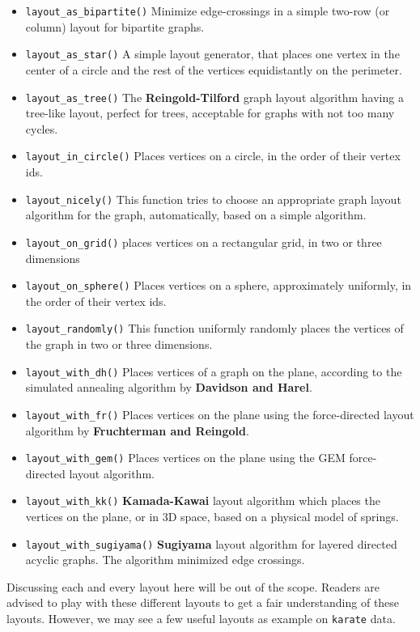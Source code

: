 \documentclass[
]{book}
\providecommand{\tightlist}{%
  \setlength{\itemsep}{0pt}\setlength{\parskip}{0pt}}
\begin{document}
\begin{itemize}
\tightlist
\item
  \texttt{layout\_as\_bipartite()} Minimize edge-crossings in a simple two-row (or column) layout for bipartite graphs.
\item
  \texttt{layout\_as\_star()} A simple layout generator, that places one vertex in the center of a circle and the rest of the vertices equidistantly on the perimeter.
\item
  \texttt{layout\_as\_tree()} The \textbf{Reingold-Tilford} graph layout algorithm having a tree-like layout, perfect for trees, acceptable for graphs with not too many cycles.
\item
  \texttt{layout\_in\_circle()} Places vertices on a circle, in the order of their vertex ids.
\item
  \texttt{layout\_nicely()} This function tries to choose an appropriate graph layout algorithm for the graph, automatically, based on a simple algorithm.
\item
  \texttt{layout\_on\_grid()} places vertices on a rectangular grid, in two or three dimensions
\item
  \texttt{layout\_on\_sphere()} Places vertices on a sphere, approximately uniformly, in the order of their vertex ids.
\item
  \texttt{layout\_randomly()} This function uniformly randomly places the vertices of the graph in two or three dimensions.
\item
  \texttt{layout\_with\_dh()} Places vertices of a graph on the plane, according to the simulated annealing algorithm by \textbf{Davidson and Harel}.
\item
  \texttt{layout\_with\_fr()} Places vertices on the plane using the force-directed layout algorithm by \textbf{Fruchterman and Reingold}.
\item
  \texttt{layout\_with\_gem()} Places vertices on the plane using the GEM force-directed layout algorithm.
\item
  \texttt{layout\_with\_kk()} \textbf{Kamada-Kawai} layout algorithm which places the vertices on the plane, or in 3D space, based on a physical model of springs.
\item
  \texttt{layout\_with\_sugiyama()} \textbf{Sugiyama} layout algorithm for layered directed acyclic graphs. The algorithm minimized edge crossings.
\end{itemize}

Discussing each and every layout here will be out of the scope. Readers are advised to play with these different layouts to get a fair understanding of these layouts. However, we may see a few useful layouts as example on \texttt{karate} data.
\end{document}
